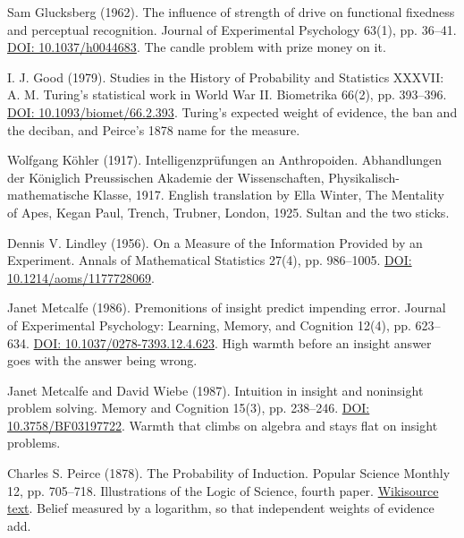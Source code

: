 \documentclass[11pt,twoside]{article}
\theoremstyle{thielethm}
\theoremstyle{thieledef}
\theoremstyle{thieledef}
\theoremstyle{thieledef}
\theoremstyle{thielethm}
\theoremstyle{thieleobs}
\theoremstyle{thielethm}
\begin{document}
\noindent Sam Glucksberg (1962). The influence of strength of drive on functional fixedness and perceptual recognition. Journal of Experimental Psychology 63(1), pp. 36--41. \href{https://doi.org/10.1037/h0044683}{DOI: 10.1037/h0044683}. The candle problem with prize money on it.
\par\medskip

\noindent I. J. Good (1979). Studies in the History of Probability and Statistics XXXVII: A. M. Turing's statistical work in World War II. Biometrika 66(2), pp. 393--396. \href{https://doi.org/10.1093/biomet/66.2.393}{DOI: 10.1093/biomet/66.2.393}. Turing's expected weight of evidence, the ban and the deciban, and Peirce's 1878 name for the measure.
\par\medskip

\noindent Wolfgang K\"ohler (1917). Intelligenzpr\"ufungen an Anthropoiden. Abhandlungen der K\"oniglich Preussischen Akademie der Wissenschaften, Physikalisch-mathematische Klasse, 1917. English translation by Ella Winter, The Mentality of Apes, Kegan Paul, Trench, Trubner, London, 1925. Sultan and the two sticks.
\par\medskip

\noindent Dennis V. Lindley (1956). On a Measure of the Information Provided by an Experiment. Annals of Mathematical Statistics 27(4), pp. 986--1005. \href{https://doi.org/10.1214/aoms/1177728069}{DOI: 10.1214/aoms/1177728069}.
\par\medskip

\noindent Janet Metcalfe (1986). Premonitions of insight predict impending error. Journal of Experimental Psychology: Learning, Memory, and Cognition 12(4), pp. 623--634. \href{https://doi.org/10.1037/0278-7393.12.4.623}{DOI: 10.1037/0278-7393.12.4.623}. High warmth before an insight answer goes with the answer being wrong.
\par\medskip

\noindent Janet Metcalfe and David Wiebe (1987). Intuition in insight and noninsight problem solving. Memory and Cognition 15(3), pp. 238--246. \href{https://doi.org/10.3758/BF03197722}{DOI: 10.3758/BF03197722}. Warmth that climbs on algebra and stays flat on insight problems.
\par\medskip

\noindent Charles S. Peirce (1878). The Probability of Induction. Popular Science Monthly 12, pp. 705--718. Illustrations of the Logic of Science, fourth paper. \href{https://en.wikisource.org/wiki/Popular_Science_Monthly/Volume_12/April_1878/Illustrations_of_the_Logic_of_Science_IV}{Wikisource text}. Belief measured by a logarithm, so that independent weights of evidence add.
\par\medskip
\end{document}
